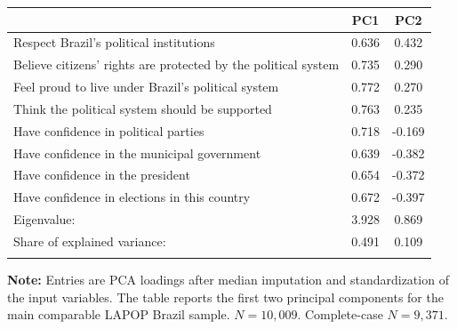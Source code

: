 \begin{tabular*}{\textwidth}{@{\extracolsep{\fill}}lcc}
\doubletoprule
 & PC1 & PC2 \\
\midrule
Respect Brazil's political institutions & 0.636 & 0.432 \\
Believe citizens' rights are protected by the political system & 0.735 & 0.290 \\
Feel proud to live under Brazil's political system & 0.772 & 0.270 \\
Think the political system should be supported & 0.763 & 0.235 \\
Have confidence in political parties & 0.718 & -0.169 \\
Have confidence in the municipal government & 0.639 & -0.382 \\
Have confidence in the president & 0.654 & -0.372 \\
Have confidence in elections in this country & 0.672 & -0.397 \\
\midrule
Eigenvalue: & 3.928 & 0.869 \\
Share of explained variance: & 0.491 & 0.109 \\
\doublebottomrule
\end{tabular*}

\begin{minipage}{\textwidth}
\footnotesize
\textbf{Note:} Entries are PCA loadings after median imputation and standardization of the input variables. The table reports the first two principal components for the main comparable LAPOP Brazil sample. $N = 10,009$. Complete-case $N = 9,371.$
\end{minipage}
